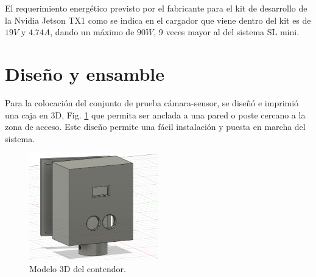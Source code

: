 El requerimiento energético previsto por el fabricante para el kit de desarrollo de la Nvidia Jetson TX1 como se indica
en el cargador que viene dentro del kit es de $19V$ y $4.74A$, dando un máximo de $90W$, 9 veces mayor al del sistema SL mini.

\section{Diseño y ensamble}

Para la colocación del conjunto de prueba cámara-sensor, se diseñó e imprimió una caja en 3D, Fig. \ref{fig:contenedor-camara} que permita ser anclada a una pared o poste cercano a la zona de acceso. Este diseño permite una fácil instalación y puesta en marcha del sistema.
\begin{figure}[bth]
    \centering
    \includegraphics[width=0.5\textwidth]{imgs/contenedor-camara.png}
    \caption{Modelo 3D del contendor.}
    \label{fig:contenedor-camara}
\end{figure}

